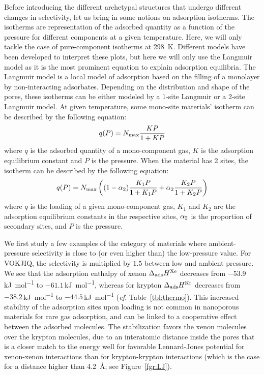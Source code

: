 \documentclass[main.tex]{subfiles}
\begin{document}
Before introducing the different archetypal structures that undergo different changes in selectivity, let us bring in some notions on adsorption isotherms. The isotherms are representation of the adsorbed quantity as a function of the pressure for different components at a given temperature. Here, we will only tackle the case of pure-component isotherms at \SI{298}{\kelvin}. Different models have been developed to interpret these plots,\autocite{Al_Ghouti_2020} but here we will only use the Langmuir model as it is the most prominent equation to explain adsorption equilibria. The Langmuir model is a local model of adsorption based on the filling of a monolayer by non-interacting adsorbates. Depending on the distribution and shape of the pores, these isotherms can be either modeled by a 1-site Langmuir or a 2-site Langmuir model. At given temperature, some mono-site materials' isotherm can be described by the following equation:
\begin{equation}\label{eq:langmuir_1}
    q(P) = N_{\text{max}}\dfrac{KP}{1+KP}
\end{equation}
where $q$ is the adsorbed quantity of a mono-component gas, $K$ is the adsorption equilibrium constant and $P$ is the pressure. When the material has 2 sites, the isotherm can be described by the following equation:
\begin{equation}\label{eq:langmuir_2}
    q(P) = N_{\text{max}}\left((1-\alpha_{\text{2}})\dfrac{K_{\text{1}}P}{1+K_{\text{1}}P}+\alpha_{\text{2}}\dfrac{K_{\text{2}}P}{1+K_{\text{2}}P}\right)
\end{equation}
where $q$ is the loading of a given mono-component gas, $K_1$ and $K_2$ are the adsorption equilibrium constants in the respective sites, $\alpha_{\text{2}}$ is the proportion of secondary sites, and $P$ is the pressure.
  
We first study a few examples of the category of materials where ambient-pressure selectivity is close to (or even higher than) the low-pressure value. For VOKJIQ, the selectivity is multiplied by $1.5$ between low and ambient pressure. We see that the adsorption enthalpy of xenon $\Delta_{\text{ads}}H^{\text{Xe}}$ decreases from $-53.9$\,\si{\kilo\joule\per\mol} to $-61.1$\,\si{\kilo\joule\per\mol}, whereas for krypton $\Delta_{\text{ads}}H^{\text{Kr}}$ decreases from $-38.2$\,\si{\kilo\joule\per\mol} to $-44.5$\,\si{\kilo\joule\per\mol} (\emph{cf.} Table~\ref{tbl:thermo}). This increased stability of the adsorption sites upon loading is not common in nanoporous materials for rare gas adsorption, and can be linked to a cooperative effect between the adsorbed molecules. The stabilization favors the xenon molecules over the krypton molecules, due to an interatomic distance inside the pores that is a closer match to the energy well for favorable Lennard-Jones potential for xenon-xenon interactions than for krypton-krypton interactions (which is the case for a distance higher than \SI{4.2}{\angstrom}; see Figure~\ref{fgr:LJ}).
\end{document}

